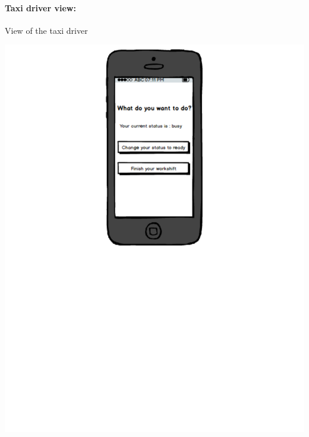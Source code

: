 \paragraph{Taxi driver view:}
View of the taxi driver
\begin{center}
	\includegraphics[width=\textwidth]{mockup/taxiDriverFunctions.pdf}
\end{center}

